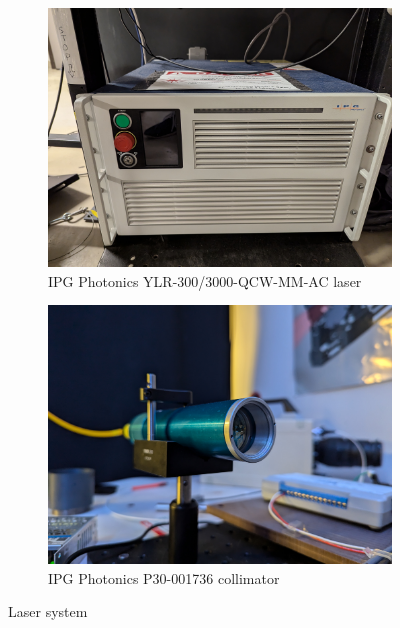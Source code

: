             \begin{figure}[!ht]
                \centering
                \begin{subfigure}[t]{0.45\textwidth}
                    \centering
                    \includegraphics[width=\textwidth]{assets/3 design/Laser box.jpg}
                    \caption{IPG Photonics YLR-300/3000-QCW-MM-AC laser}
                \end{subfigure}
                \hfill
                \begin{subfigure}[t]{0.45\textwidth}
                    \centering
                    \includegraphics[width=\textwidth]{assets/3 design/Laser aperture.jpg}
                    \caption{IPG Photonics P30-001736 collimator}
                \end{subfigure}
                \caption{Laser system}
                \label{fig:laser and collimator}
            \end{figure}

